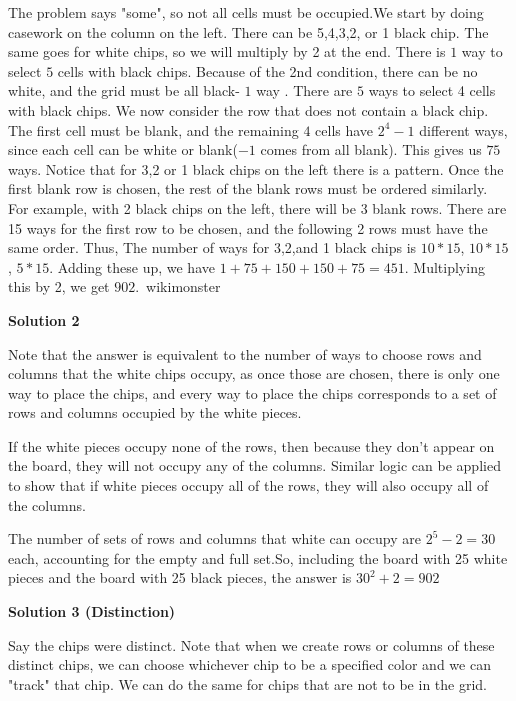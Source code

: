 \begin{enumerate}
The problem says "some", so not all cells must be occupied.We start by doing casework on the column on the left. There can be 5,4,3,2, or 1 black chip. The same goes for white chips, so we will multiply by 2 at the end. There is $1$ way to select $5$ cells with black chips. Because of the 2nd condition, there can be no white, and the grid must be all black- $1$ way . There are $5$ ways to select 4 cells with black chips. We now consider the row that does not contain a black chip. The first cell must be blank, and the remaining $4$ cells have $2^4-1$ different ways, since each cell can be white or blank($-1$ comes from all blank). This gives us $75$ ways. Notice that for 3,2 or 1 black chips on the left there is a pattern. Once the first blank row is chosen, the rest of the blank rows must be ordered similarly. For example, with 2 black chips on the left, there will be 3 blank rows. There are 15 ways for the first row to be chosen, and the following 2 rows must have the same order. Thus, The number of ways for 3,2,and 1 black chips is $10*15$, $10*15$, $5*15$. Adding these up, we have $1+75+150+150+75 = 451$. Multiplying this by 2, we get $\boxed{902}$.~wikimonster

 



\textbf{Solution 2}

Note that the answer is equivalent to the number of ways to choose rows and columns that the white chips occupy, as once those are chosen, there is only one way to place the chips, and every way to place the chips corresponds to a set of rows and columns occupied by the white pieces.

 If the white pieces occupy none of the rows, then because they don't appear on the board, they will not occupy any of the columns. Similar logic can be applied to show that if white pieces occupy all of the rows, they will also occupy all of the columns.

 The number of sets of rows and columns that white can occupy are $2^{5} - 2 = 30$ each, accounting for the empty and full set.So, including the board with 25 white pieces and the board with 25 black pieces, the answer is $30^{2}+2 = \boxed{902}$




\textbf{Solution 3 (Distinction)}

Say the chips were distinct. Note that when we create rows or columns of these distinct chips, we can choose whichever chip to be a specified color and we can "track" that chip. We can do the same for chips that are not to be in the grid.


\end{enumerate}
